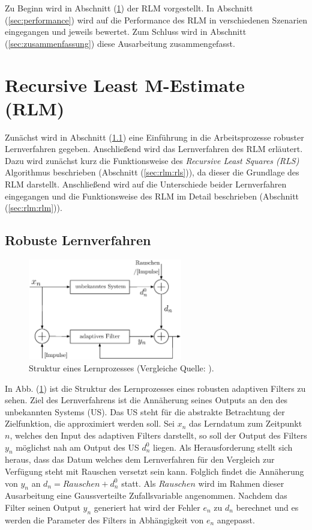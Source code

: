 \documentclass[a4paper, 12pt]{article}
\begin{document}
Zu Beginn wird in Abschnitt (\ref{sec:rlm}) der RLM vorgestellt. In Abschnitt (\ref{sec:performance}) wird auf die Performance des RLM in verschiedenen Szenarien eingegangen und jeweils bewertet. Zum Schluss wird in Abschnitt (\ref{sec:zusammenfassung}) diese Ausarbeitung zusammengefasst.


\section{Recursive Least M-Estimate (RLM)}
\label{sec:rlm}
Zunächst wird in Abschnitt (\ref{sec:rlm:einleitung}) eine Einführung in die Arbeitsprozesse robuster Lernverfahren gegeben. Anschließend wird das Lernverfahren des RLM erläutert. Dazu wird zunächst kurz die Funktionsweise des \emph{Recursive Least Squares (RLS)} Algorithmus beschrieben (Abschnitt (\ref{sec:rlm:rls})), da dieser die Grundlage des RLM darstellt. Anschließend wird auf die Unterschiede beider Lernverfahren eingegangen und die Funktionsweise des RLM im Detail beschrieben (Abschnitt (\ref{sec:rlm:rlm})).

\subsection{Robuste Lernverfahren}
\label{sec:rlm:einleitung}
\begin{figure}[H]
    \centering
    \includegraphics[width=0.6\textwidth]{./images/system_identification.eps}
    \caption{Struktur eines Lernprozesses (Vergleiche Quelle: \cite{zou2000recursive}).}
    \label{fig:struktur_lernprozess}
\end{figure}
In Abb. (\ref{fig:struktur_lernprozess}) ist die Struktur des Lernprozesses eines robusten adaptiven Filters zu sehen. Ziel des Lernverfahrens ist die Annäherung seines Outputs an den des unbekannten Systems (US). Das US steht für die abstrakte Betrachtung der Zielfunktion, die approximiert werden soll. Sei $x_n$ das Lerndatum zum Zeitpunkt $n$, welches den Input des adaptiven Filters darstellt, so soll der Output des Filters $y_n$ möglichst nah am Output des US $d^0_n$ liegen.
Als Herausforderung stellt sich heraus, dass das Datum welches dem Lernverfahren für den Vergleich zur Verfügung steht mit Rauschen versetzt sein kann. Folglich findet die Annäherung von $y_n$ an $d_n = Rauschen+d^0_n$ statt. Als $Rauschen$ wird im Rahmen dieser Ausarbeitung eine Gaussverteilte Zufallsvariable angenommen.
Nachdem das Filter seinen Output $y_n$ generiert hat wird der Fehler $e_n$ zu $d_n$ berechnet und es werden die Parameter des Filters in Abhängigkeit von $e_n$ angepasst.
\end{document}

